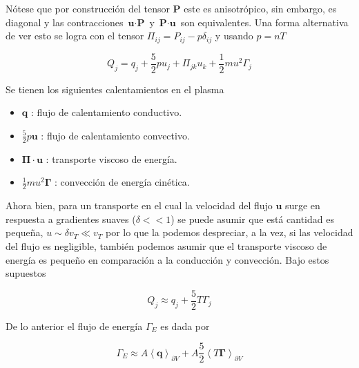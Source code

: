   N\'otese que por construcci\'on del tensor $\textbf{P}$ este es anisotr\'opico, sin embargo, es diagonal y las contracciones $\textbf{u}\cdot\textbf{P}$ y $\textbf{P}\cdot\textbf{u}$ son equivalentes. Una forma alternativa de ver esto se logra con el tensor $\Pi_{ij} = P_{ij} - p\delta_{ij}$ y usando $p = nT$ 

  \begin{equation}
    Q_j = q_j + \frac{5}{2}pu_j + \Pi_{jk}u_k + \frac{1}{2}mu^2\Gamma_j
  \end{equation}

  Se tienen los siguientes calentamientos en el plasma\cite{helander2005}

  \begin{itemize}
    \item $\textbf{q}$ : flujo de calentamiento conductivo.
    \item $\frac{5}{2}p\textbf{u}$ : flujo de calentamiento convectivo.
    \item $\pmb{\Pi}\cdot\textbf{u}$ : transporte viscoso de energ\'ia.
    \item $\frac{1}{2}mu^2\pmb{\Gamma}$ : convecci\'on de energ\'ia cin\'etica.
  \end{itemize}

Ahora bien, para un transporte en el cual la velocidad del flujo $\textbf{u}$ surge en respuesta a gradientes suaves ($\delta << 1$) se puede asumir que est\'a cantidad es pequeña, $u \sim \delta v_T \ll v_T$ por lo que la podemos despreciar, a la vez, si las velocidad del flujo es negligible, tambi\'en podemos asumir que el transporte viscoso de energ\'ia es pequeño en comparaci\'on a la conducci\'on y convecci\'on. Bajo estos supuestos\cite{dinklage2005}

  \begin{equation*}
    Q_j \approx q_j + \frac{5}{2}T\Gamma_j
  \end{equation*}

  De lo anterior el flujo de energ\'ia $\Gamma_E$ es dada por 

  \begin{equation}\label{eq:heatfluxp}
    \Gamma_E \approx A\left<\textbf{q}\right>_{\partial V} + A\frac{5}{2}\left<T\pmb{\Gamma}\right>_{\partial V}
  \end{equation}

